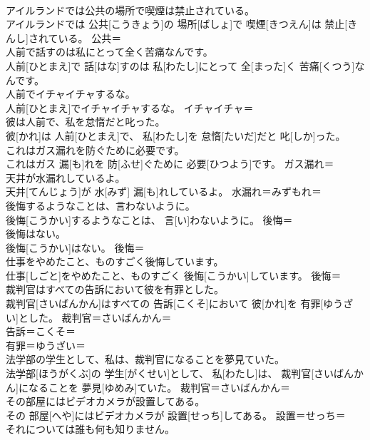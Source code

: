 \documentclass[8pt]{extreport}
\begin{document}
\begin{CJK}{UTF8}{min}
\\	アイルランドでは公共の場所で喫煙は禁止されている。	
\\	アイルランドでは 公共[こうきょう]の 場所[ばしょ]で 喫煙[きつえん]は 禁止[きんし]されている。	公共＝ 
\\	人前で話すのは私にとって全く苦痛なんです。	
\\	人前[ひとまえ]で 話[はな]すのは 私[わたし]にとって 全[まった]く 苦痛[くつう]なんです。	
\\	人前でイチャイチャするな。	
\\	人前[ひとまえ]でイチャイチャするな。	イチャイチャ＝ 
\\	彼は人前で、私を怠惰だと叱った。	
\\	彼[かれ]は 人前[ひとまえ]で、 私[わたし]を 怠惰[たいだ]だと 叱[しか]った。	
\\	これはガス漏れを防ぐために必要です。	
\\	これはガス 漏[も]れを 防[ふせ]ぐために 必要[ひつよう]です。	ガス漏れ＝ 
\\	天井が水漏れしているよ。	
\\	天井[てんじょう]が 水[みず] 漏[も]れしているよ。	水漏れ＝みずもれ＝ 
\\	後悔するようなことは、言わないように。	
\\	後悔[こうかい]するようなことは、 言[い]わないように。	後悔＝ 
\\	後悔はない。	
\\	後悔[こうかい]はない。	後悔＝ 
\\	仕事をやめたこと、ものすごく後悔しています。	
\\	仕事[しごと]をやめたこと、ものすごく 後悔[こうかい]しています。	後悔＝ 
\\	裁判官はすべての告訴において彼を有罪とした。	
\\	裁判官[さいばんかん]はすべての 告訴[こくそ]において 彼[かれ]を 有罪[ゆうざい]とした。	裁判官＝さいばんかん＝ 
\\	告訴＝こくそ＝ 
\\	有罪＝ゆうざい＝ 
\\	法学部の学生として、私は、裁判官になることを夢見ていた。	
\\	法学部[ほうがくぶ]の 学生[がくせい]として、 私[わたし]は、 裁判官[さいばんかん]になることを 夢見[ゆめみ]ていた。	裁判官＝さいばんかん＝ 
\\	その部屋にはビデオカメラが設置してある。	
\\	その 部屋[へや]にはビデオカメラが 設置[せっち]してある。	設置＝せっち＝ 
\\	それについては誰も何も知りません。	

\end{CJK}
\end{document}

